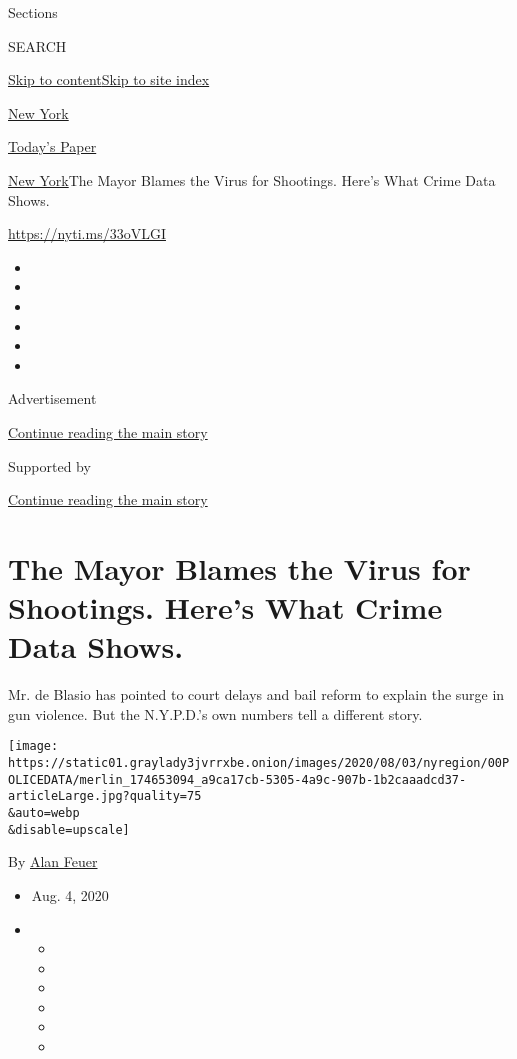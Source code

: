 Sections

SEARCH

\protect\hyperlink{site-content}{Skip to
content}\protect\hyperlink{site-index}{Skip to site index}

\href{https://www.nytimes3xbfgragh.onion/section/nyregion}{New York}

\href{https://myaccount.nytimes3xbfgragh.onion/auth/login?response_type=cookie\&client_id=vi}{}

\href{https://www.nytimes3xbfgragh.onion/section/todayspaper}{Today's
Paper}

\href{/section/nyregion}{New York}\textbar{}The Mayor Blames the Virus
for Shootings. Here's What Crime Data Shows.

\url{https://nyti.ms/33oVLGI}

\begin{itemize}
\item
\item
\item
\item
\item
\item
\end{itemize}

Advertisement

\protect\hyperlink{after-top}{Continue reading the main story}

Supported by

\protect\hyperlink{after-sponsor}{Continue reading the main story}

\hypertarget{the-mayor-blames-the-virus-for-shootings-heres-what-crime-data-shows}{%
\section{The Mayor Blames the Virus for Shootings. Here's What Crime
Data
Shows.}\label{the-mayor-blames-the-virus-for-shootings-heres-what-crime-data-shows}}

Mr. de Blasio has pointed to court delays and bail reform to explain the
surge in gun violence. But the N.Y.P.D.'s own numbers tell a different
story.

\texttt{[image: https://static01.graylady3jvrrxbe.onion/images/2020/08/03/nyregion/00POLICEDATA/merlin\_174653094\_a9ca17cb-5305-4a9c-907b-1b2caaadcd37-articleLarge.jpg?quality=75\\\&auto=webp\\\&disable=upscale]}

By \href{https://www.nytimes3xbfgragh.onion/by/alan-feuer}{Alan Feuer}

\begin{itemize}
\item
  Aug. 4, 2020
\item
  \begin{itemize}
  \item
  \item
  \item
  \item
  \item
  \item
  \end{itemize}
\end{itemize}

